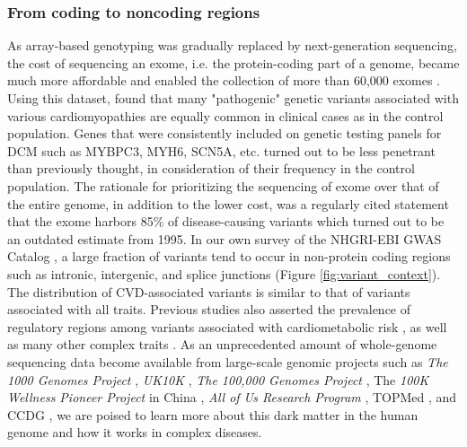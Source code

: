 \documentclass[letter]{bioinfo}
\begin{document}
\subsubsection*{From coding to noncoding regions}	
	As array-based genotyping was gradually replaced by next-generation sequencing, the cost of sequencing an exome, i.e. the protein-coding part of a genome, became much more affordable and enabled the collection of more than 60,000 exomes \citep{Lek:2016:Analysis}. Using this dataset, \cite{Walsh:2017:Reassessment} found that many "pathogenic" genetic variants associated with various cardiomyopathies are equally common in clinical cases as in the control population. Genes that were consistently included on genetic testing panels for DCM such as MYBPC3, MYH6, SCN5A, etc. turned out to be less penetrant than previously thought, in consideration of their frequency in the control population. The rationale for prioritizing the sequencing of exome over that of the entire genome, in addition to the lower cost, was a regularly cited statement that the exome harbors 85\% of disease-causing variants \citep{Antonarakis:2001:nature} which turned out to be an outdated estimate from 1995. In our own survey of the NHGRI-EBI GWAS Catalog \citep{MacArthur:2017:new}, a large fraction of variants tend to occur in non-protein coding regions such as intronic, intergenic, and splice junctions (Figure \ref{fig:variant_context}). The distribution of CVD-associated variants is similar to that of variants associated with all traits. Previous studies also asserted the prevalence of regulatory regions among variants associated with cardiometabolic risk \citep{Franzen:2016:Cardiometabolic}, as well as many other complex traits \citep{Pickrell:2014:Joint}. As an unprecedented amount of whole-genome sequencing data become available from large-scale genomic projects such as \textit{The 1000 Genomes Project} \citep{1000G:2015:global}, \textit{UK10K} \citep{TheUK10KConsortium:2015:UK10K}, \textit{The 100,000 Genomes Project} \citep{Caulfield:2017:100K}, The \textit{100K Wellness Pioneer Project} in China \citep{Kalia:2017:China}, \textit{All of Us Research Program} \citep{NIH:2018:All}, TOPMed \citep{NHLBI:2014:TransOmics}, and CCDG \citep{NHGRI:2016:CCDG}, we are poised to learn more about this dark matter in the human genome and how it works in complex diseases.
\end{document}
